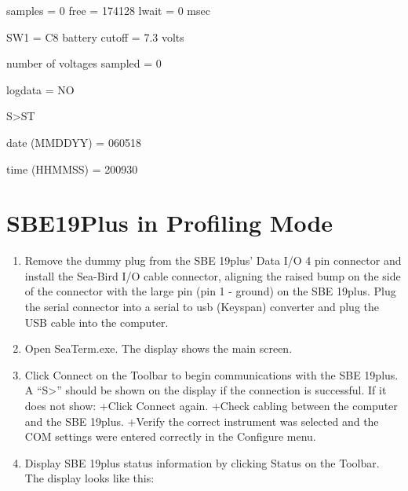 \documentclass[]{book}
\providecommand{\tightlist}{%
  \setlength{\itemsep}{0pt}\setlength{\parskip}{0pt}}
\begin{document}
samples = 0 free = 174128 lwait = 0 msec

SW1 = C8 battery cutoff = 7.3 volts

number of voltages sampled = 0

logdata = NO

S\textgreater{}ST

date (MMDDYY) = 060518

time (HHMMSS) = 200930

\section{SBE19Plus in Profiling Mode}\label{sbe19plus-in-profiling-mode}

\begin{enumerate}
\def\labelenumi{\arabic{enumi}.}
\tightlist
\item
  Remove the dummy plug from the SBE 19plus' Data I/O 4 pin connector
  and install the Sea-Bird I/O cable connector, aligning the raised bump
  on the side of the connector with the large pin (pin 1 - ground) on
  the SBE 19plus. Plug the serial connector into a serial to usb
  (Keyspan) converter and plug the USB cable into the computer.
\item
  Open SeaTerm.exe. The display shows the main screen.
\item
  Click Connect on the Toolbar to begin communications with the SBE
  19plus. A ``S\textgreater{}'' should be shown on the display if the
  connection is successful. If it does not show: +Click Connect again.
  +Check cabling between the computer and the SBE 19plus. +Verify the
  correct instrument was selected and the COM settings were entered
  correctly in the Configure menu.
\item
  Display SBE 19plus status information by clicking Status on the
  Toolbar. The display looks like this:


\end{enumerate}
\end{document}
